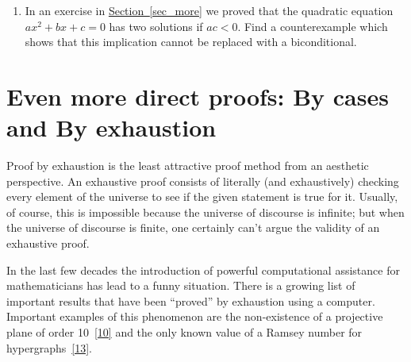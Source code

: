 \documentclass[10pt,]{book}
\theoremstyle{plain}
\theoremstyle{definition}
\theoremstyle{definition}
\numberwithin{equation}{section}
\newcommand{\hint}[1]{ }
\newcommand{\lt}{ < }
\begin{document}
\begin{enumerate}[label=(\alph*)]
          \hint{Hint: List all of the divisors of \(36 = (2\cdot 3)^2\).  See if any of them are bigger than \(6\).}
\item\hypertarget{li-271}{}
          In an exercise in \hyperref[sec_more]{Section~\ref{sec_more}} we proved that the quadratic 
          equation \(ax^2 + bx + c = 0\) has two solutions if \(ac \lt  0\).  Find a counterexample which shows that this implication cannot be replaced with a biconditional.  

          \hint{We'd want \(ac\) to be positive (so \(a\) and \(c\) have the same sign) but nevertheless have \(b^2-4ac > 0\).  It seems that if we make \(b\) sufficiently large that could happen.}
\end{enumerate}
\typeout{************************************************}
\typeout{************************************************}
\section[{Even more direct proofs: By cases and By exhaustion}]{Even more direct proofs: By cases and By exhaustion}\label{sec_cases}

    Proof by exhaustion is the least attractive proof method from
    an aesthetic perspective. An exhaustive proof consists of literally
    (and exhaustively) checking every element of the universe to see
    if the given statement is true for it. Usually, of course, this is
    impossible because the universe of discourse is infinite; but when the
    universe of discourse is finite, one certainly can't argue the validity
    of an exhaustive proof.
\par

    In the last few decades the introduction of powerful computational
    assistance for mathematicians has lead to a funny situation. There
    is a growing list of important results that have been ``proved'' by
    exhaustion using a computer. Important examples of this phenomenon
    are the non-existence of a
    projective plane of order 10~\hyperlink{lam}{[10]} and the
    only known value of a
    Ramsey number for hypergraphs~\hyperlink{radz}{[13]}.
\par
\end{document}
